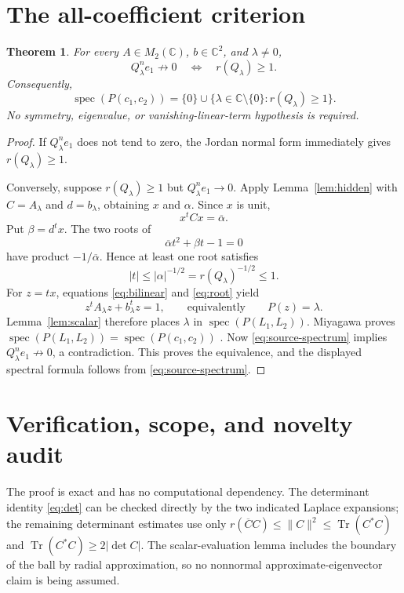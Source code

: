 \documentclass[11pt]{article}
\newtheorem{theorem}{Theorem}
\newcommand{\C}{\mathbb C}
\newcommand{\specop}{\operatorname{spec}}
\newcommand{\tr}{\operatorname{Tr}}
\begin{document}
\section{The all-coefficient criterion}

\begin{theorem}\label{thm:main}
For every $A\in M_2(\C)$, $b\in\C^2$, and $\lambda\ne0$,
\[
 Q_\lambda^ne_1\not\longrightarrow0
 \quad\Longleftrightarrow\quad
 r(Q_\lambda)\ge1.
\]
Consequently,
\[
 \specop(P(c_1,c_2))
 =\{0\}\cup\{\lambda\in\C\setminus\{0\}:r(Q_\lambda)\ge1\}.
\]
No symmetry, eigenvalue, or vanishing-linear-term hypothesis is required.
\end{theorem}

\begin{proof}
If $Q_\lambda^ne_1$ does not tend to zero, the Jordan normal form immediately
gives $r(Q_\lambda)\ge1$.

Conversely, suppose $r(Q_\lambda)\ge1$ but
$Q_\lambda^ne_1\to0$.  Apply Lemma~\ref{lem:hidden} with
$C=A_\lambda$ and $d=b_\lambda$, obtaining $x$ and $\alpha$.  Since $x$ is
unit,
\begin{equation}\label{eq:bilinear}
                   x^tCx=\overline\alpha.
\end{equation}
Put $\beta=d^t x$.  The two roots of
\begin{equation}\label{eq:root}
             \overline\alpha t^2+\beta t-1=0
\end{equation}
have product $-1/\overline\alpha$.  Hence at least one root satisfies
\[
 |t|\le|\alpha|^{-1/2}=r(Q_\lambda)^{-1/2}\le1.
\]
For $z=tx$, equations \eqref{eq:bilinear} and \eqref{eq:root} yield
\[
 z^tA_\lambda z+b_\lambda^tz=1,
 \qquad\text{equivalently}\qquad P(z)=\lambda.
\]
Lemma~\ref{lem:scalar} therefore places $\lambda$ in
$\specop(P(L_1,L_2))$.  Miyagawa proves
$\specop(P(L_1,L_2))=\specop(P(c_1,c_2))$
\cite[Corollary after Lemma~4.1]{Miyagawa}.  Now
\eqref{eq:source-spectrum} implies
$Q_\lambda^ne_1\not\to0$, a contradiction.  This proves the equivalence, and
the displayed spectral formula follows from \eqref{eq:source-spectrum}.
\end{proof}

\section{Verification, scope, and novelty audit}

The proof is exact and has no computational dependency.  The determinant
identity \eqref{eq:det} can be checked directly by the two indicated Laplace
expansions; the remaining determinant estimates use only
$r(\overline C C)\le\|C\|^2\le\tr(C^*C)$ and
$\tr(C^*C)\ge2|\det C|$.  The scalar-evaluation lemma includes the boundary
of the ball by radial approximation, so no nonnormal approximate-eigenvector
claim is being assumed.
\end{document}
